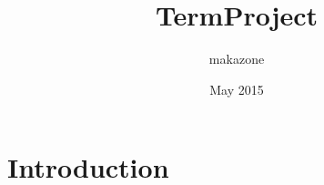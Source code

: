 \documentclass{article}
\title{TermProject}
\author{makazone }
\date{May 2015}
\begin{document}
\maketitle

\section{Introduction}
\end{document}
